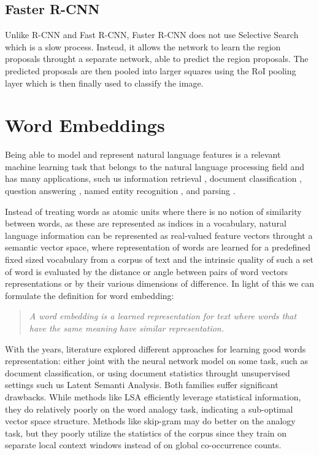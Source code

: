 \subsection{Faster R-CNN}
\label{subsec:faster-rcnn}

Unlike R-CNN and Fast R-CNN, Faster R-CNN \cite{ren2015faster} does
not use Selective Search which is a slow process. Instead, it allows
the network to learn the region proposals throught a separate network,
able to predict the region proposals. The predicted proposals are then
pooled into larger squares using the RoI pooling layer which is then
finally used to classify the image.

\section{Word Embeddings}
\label{sec:word-embeddings}

Being able to model and represent natural language features is a
relevant machine learning task that belongs to the natural language
processing field and has many applications, such us information
retrieval \cite{sanderson2010christopher}, document classification
\cite{sebastiani2002machine}, question answering
\cite{tellex2003quantitative}, named entity recognition
\cite{turian2010word}, and parsing \cite{socher2013parsing}.

Instead of treating words as atomic units where there is no notion of
similarity between words, as these are represented as indices in a
vocabulary, natural language information can be represented as
real-valued feature vectors throught a semantic vector space, where
representation of words are learned for a predefined fixed sized
vocabulary from a corpus of text and the intrinsic quality of such a
set of word is evaluated by the distance or angle between pairs of
word vectors representations or by their various dimensions of
difference\cite{mikolov2013linguistic}. In light of this we can
formulate the definition for word embedding: 

\begin{quote}
  \textit{A word embedding is a learned representation for text where
  words that have the same meaning have similar representation.}
\end{quote}

With the years, literature explored different approaches for learning
good words representation: either joint with the neural network model
on some task, such as document classification, or using document
statistics throught unsupervised settings such us Latent Semanti
Analysis. Both families suffer significant drawbacks. While methods
like LSA efficiently leverage statistical information, they do
relatively poorly on the word analogy task, indicating a sub-optimal
vector space structure. Methods like skip-gram may do better on the
analogy task, but they poorly utilize the statistics of the corpus
since they train on separate local context windows instead of on
global co-occurrence counts.

